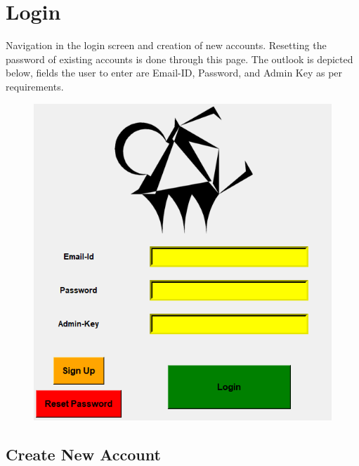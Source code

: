 \chapter{Login}

Navigation in the login screen and creation of new accounts. Resetting the password of existing accounts is done through this page. The outlook is depicted below, fields the user to enter are Email-ID, Password, and Admin Key as per requirements.  

\begin{figure}[H]
	\centering
	\includegraphics[width=0.6\linewidth]{images/login_page/login_1}
	\label{fig:login1}
\end{figure}

\section{Create New Account}

